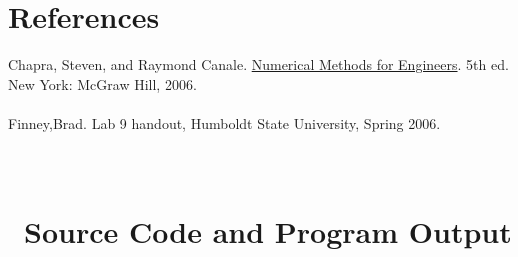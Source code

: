 \documentclass[titlepage,12pt]{article}
\begin{document}
\section{References}
Chapra, Steven, and Raymond Canale. \underline{Numerical Methods for
Engineers}. 5th ed. New York: McGraw Hill, 2006.
\\
\\
\noindent Finney,Brad. Lab 9 handout, Humboldt State University,
Spring 2006.

\appendix
\newcommand{\appsection}[1]{\let\oldthesection\thesection
  \renewcommand{\thesection}{Appendix \oldthesection}
  \section{#1}\let\thesection\oldthesection}
\appsection{\\~Source Code and Program Output} \label{sec:source}
\end{document}
